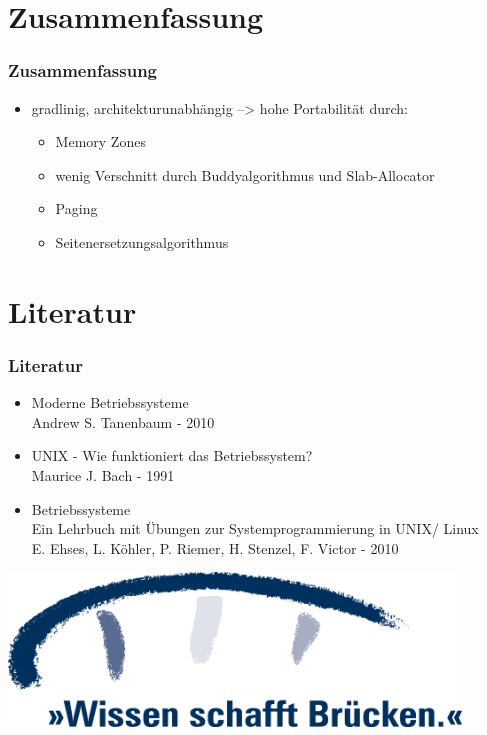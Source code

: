 \documentclass[ddcfooter,nosectionnum]{tudbeamer}
\begin{document}
\section{Zusammenfassung}
\begin{frame}
    \frametitle{Zusammenfassung}
    \begin{itemize}
    	\item gradlinig, architekturunabhängig --> hohe Portabilität durch:
		\begin{itemize}
			\item Memory Zones
			\item wenig Verschnitt durch Buddyalgorithmus und Slab-Allocator 			\item Paging
			\item Seitenersetzungsalgorithmus
		\end{itemize}
	 \end{itemize}
    
\end{frame}


\section{Literatur}
\begin{frame}
    \frametitle{Literatur}
    \begin{itemize}
         \item  Moderne Betriebssysteme \\
        		Andrew S. Tanenbaum - 2010
	\item	 UNIX - Wie funktioniert das Betriebssystem? \\
		Maurice J. Bach - 1991
	\item Betriebssysteme\\
		Ein Lehrbuch mit Übungen zur Systemprogrammierung in UNIX/ Linux \\
		E. Ehses, L. Köhler, P. Riemer, H. Stenzel, F. Victor - 2010	
    \end{itemize}
    
\end{frame}

\begin{frame}

	\includegraphics[width= 0.9\textwidth]{br_logo_blau.png}

  \end{frame}
\end{document}

